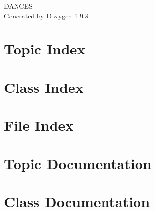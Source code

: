 \documentclass[twoside]{book}
\newcommand{\+}{\discretionary{\mbox{\scriptsize$\hookleftarrow$}}{}{}}
\newcommand{\clearemptydoublepage}{%
    \newpage{\pagestyle{empty}\cleardoublepage}%
  }
\begin{document}
  \raggedbottom
    \hypersetup{pageanchor=false,
                bookmarksnumbered=true,
                pdfencoding=unicode
               }
  \begin{titlepage}
  \vspace*{7cm}
  \begin{center}%
  {\Large DANCES}\\
  \vspace*{1cm}
  {\large Generated by Doxygen 1.9.8}\\
  \end{center}
  \end{titlepage}
  \clearemptydoublepage
  \tableofcontents
  \clearemptydoublepage
  \hypersetup{pageanchor=true}




\chapter{Topic Index}

\chapter{Class Index}

\chapter{File Index}

\chapter{Topic Documentation}



\chapter{Class Documentation}









\end{document}
